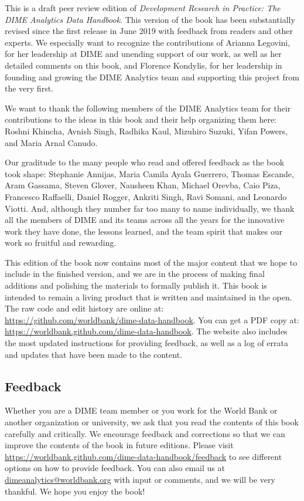 This is a draft peer review edition of
\textit{Development Research in Practice:
The DIME Analytics Data Handbook}.
This version of the book has been substantially revised
since the first release in June 2019
with feedback from readers and other experts.
We especially want to recognize the contributions of
Arianna Legovini, for her leadership at DIME and unending support of our work, 
as well as her detailed comments on this book, and 
Florence Kondylis, for her leadership in founding and growing the DIME Analytics team
and supporting this project from the very first.
 
We want to thank the following members 
of the DIME Analytics team for their contributions 
to the ideas in this book and their help organizing them here: 
Roshni Khincha, Avnish Singh, Radhika Kaul,
Mizuhiro Suzuki, Yifan Powers, and Maria Arnal Canudo.

Our graditude to the many people who read and offered feedback as the book took shape:
Stephanie Annijas,
Maria Camila Ayala Guerrero,
Thomas Escande,
Aram Gassama,
Steven Glover,
Nausheen Khan,
Michael Orevba,
Caio Piza,
Francesco Raffaelli,
Daniel Rogger,
Ankriti Singh,
Ravi Somani,
and Leonardo Viotti.
And, although they number far too many to name individually, 
we thank all the members of DIME and its teams across all the years
for the innovative work they have done, the lessons learned,
and the team spirit that makes our work so fruitful and rewarding.

This edition of the book now contains most of the major content
that we hope to include in the finished version,
and we are in the process of making final additions
and polishing the materials to formally publish it.
This book is intended to remain a living product
that is written and maintained in the open.
The raw code and edit history are online at:
\url{https://github.com/worldbank/dime-data-handbook}.
You can get a PDF copy at:
\url{https://worldbank.github.com/dime-data-handbook}.
The website also includes the most updated instructions
for providing feedback, as well as
a log of errata and updates that have been made to the content.

\subsection{Feedback}

Whether you are a DIME team member or you work for the World Bank
or another organization or university,
we ask that you read the contents of this book carefully and critically.
We encourage feedback and corrections
so that we can improve the contents of the book
in future editions. Please visit
\url{https://worldbank.github.com/dime-data-handbook/feedback} to
see different options on how to provide feedback.
You can also email us at \url{dimeanalytics@worldbank.org}
with input or comments, and we will be very thankful.
We hope you enjoy the book!
